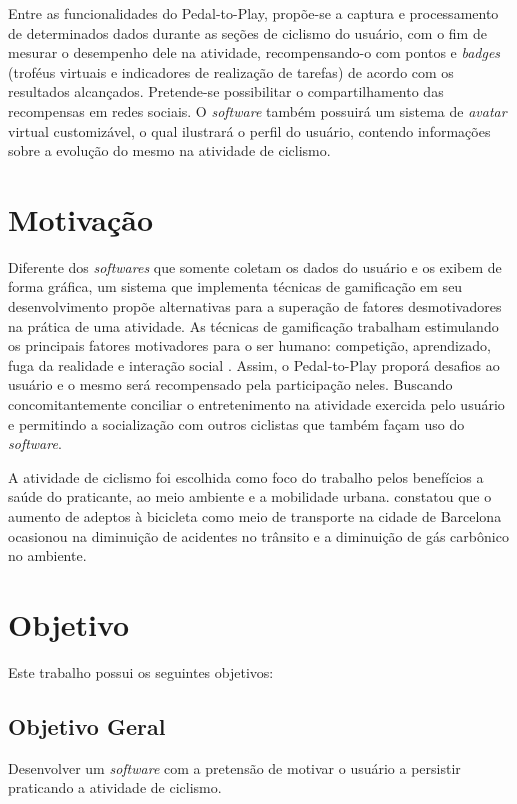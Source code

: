 Entre as funcionalidades do Pedal-to-Play, propõe-se a captura e processamento de determinados dados durante as seções de ciclismo do usuário, com o fim de mesurar o desempenho dele na atividade, recompensando-o com pontos e \textit{badges} (troféus virtuais e indicadores de realização de tarefas) de acordo com os resultados alcançados. Pretende-se possibilitar o compartilhamento das recompensas em redes sociais. O \textit{software} também possuirá um sistema de \textit{avatar} virtual customizável, o qual ilustrará o perfil do usuário, contendo informações sobre a evolução do mesmo na atividade de ciclismo.

\section{Motivação}
Diferente dos \textit{softwares} que somente coletam os dados do usuário e os exibem de forma gráfica, um sistema que implementa técnicas de gamificação em seu desenvolvimento propõe alternativas para a superação de fatores desmotivadores na prática de uma atividade. As técnicas de gamificação  trabalham estimulando os principais fatores motivadores para o ser humano: competição, aprendizado, fuga da realidade e interação social \cite{vianna2013}. Assim, o Pedal-to-Play proporá desafios ao usuário e o mesmo será recompensado pela participação neles. Buscando concomitantemente conciliar o entretenimento na atividade exercida pelo usuário e permitindo a socialização com outros ciclistas que também façam uso do \textit{software}. \par

A atividade de ciclismo foi escolhida como foco do trabalho pelos benefícios a saúde do praticante, ao meio ambiente e a mobilidade urbana. \citet{rojasrueda2011} constatou que o aumento de adeptos à bicicleta como meio de transporte na cidade de Barcelona ocasionou na diminuição de acidentes no trânsito e a diminuição de gás carbônico no ambiente.

\section{Objetivo}
Este trabalho possui os seguintes objetivos:

\subsection{Objetivo Geral}
Desenvolver um \textit{software} com a pretensão de motivar o usuário a persistir praticando a atividade de ciclismo. 

